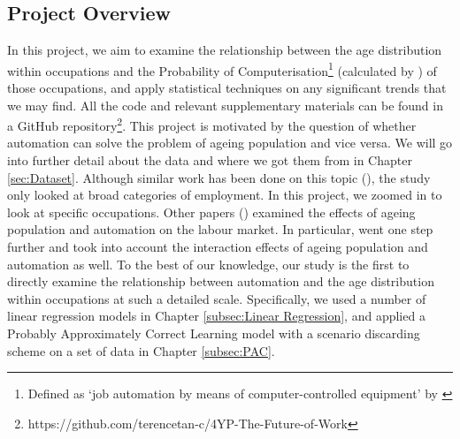\documentclass[11pt]{article}
\begin{document}

\subsection{Project Overview}
\label{subsec:projectoverview}
In this project, we aim to examine the relationship between the age distribution within occupations and the Probability of Computerisation\footnote{Defined as `job automation by means of computer-controlled equipment' by \cite{osborne2017future}} (calculated by \cite{futureofemployment}) of those occupations, and apply statistical techniques on any significant trends that we may find. All the code and relevant supplementary materials can be found in a GitHub repository\footnote{https://github.com/terencetan-c/4YP-The-Future-of-Work}. This project is motivated by the question of whether automation can solve the problem of ageing population and vice versa. We will go into further detail about the data and where we got them from in Chapter \ref{sec:Dataset}. Although similar work has been done on this topic (\cite{twinthreats}), the study only looked at broad categories of employment. In this project, we zoomed in to look at specific occupations. Other papers (\cite{10.1257/aer.p20171101,10.1371/journal.pone.0263704}) examined the effects of ageing population and automation on the labour market. In particular, \cite{10.1371/journal.pone.0263704} went one step further and took into account the interaction effects of ageing population and automation as well. To the best of our knowledge, our study is the first to directly examine the relationship between automation and the age distribution within occupations at such a detailed scale. Specifically, we used a number of linear regression models in Chapter \ref{subsec:Linear Regression}, and applied a Probably Approximately Correct Learning model with a scenario discarding scheme on a set of data in Chapter \ref{subsec:PAC}.

\end{document}
